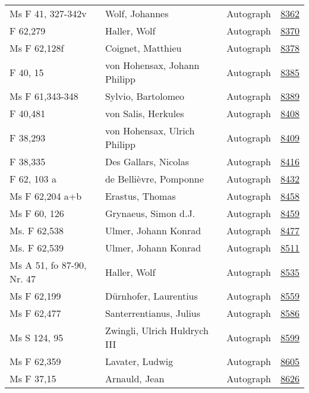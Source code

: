 \documentclass[10pt,a4paper,landscape]{report}
\begin{document}
\begin{longtable}{p{16cm}p{4cm}lr}
Ms F 41, 327-342v	&	Wolf, Johannes	&	Autograph	&	\href{http://130.60.24.72/assignment/8362}{8362}\\
F 62,279	&	Haller, Wolf	&	Autograph	&	\href{http://130.60.24.72/assignment/8370}{8370}\\
Ms F 62,128f	&	Coignet, Matthieu	&	Autograph	&	\href{http://130.60.24.72/assignment/8378}{8378}\\
F 40, 15	&	von Hohensax, Johann Philipp	&	Autograph	&	\href{http://130.60.24.72/assignment/8385}{8385}\\
Ms F 61,343-348	&	Sylvio, Bartolomeo	&	Autograph	&	\href{http://130.60.24.72/assignment/8389}{8389}\\
F 40,481	&	von Salis, Herkules	&	Autograph	&	\href{http://130.60.24.72/assignment/8408}{8408}\\
F 38,293	&	von Hohensax, Ulrich Philipp	&	Autograph	&	\href{http://130.60.24.72/assignment/8409}{8409}\\
F 38,335	&	Des Gallars, Nicolas	&	Autograph	&	\href{http://130.60.24.72/assignment/8416}{8416}\\
F 62, 103 a	&	de Bellièvre, Pomponne	&	Autograph	&	\href{http://130.60.24.72/assignment/8432}{8432}\\
Ms F 62,204 a+b	&	Erastus, Thomas	&	Autograph	&	\href{http://130.60.24.72/assignment/8458}{8458}\\
Ms F 60, 126	&	Grynaeus, Simon d.J.	&	Autograph	&	\href{http://130.60.24.72/assignment/8459}{8459}\\
Ms. F 62,538	&	Ulmer, Johann Konrad	&	Autograph	&	\href{http://130.60.24.72/assignment/8477}{8477}\\
Ms. F 62,539	&	Ulmer, Johann Konrad	&	Autograph	&	\href{http://130.60.24.72/assignment/8511}{8511}\\
Ms A 51, fo 87-90, Nr. 47	&	Haller, Wolf	&	Autograph	&	\href{http://130.60.24.72/assignment/8535}{8535}\\
Ms F 62,199	&	Dürnhofer, Laurentius	&	Autograph	&	\href{http://130.60.24.72/assignment/8559}{8559}\\
Ms F 62,477	&	Santerrentianus, Julius	&	Autograph	&	\href{http://130.60.24.72/assignment/8586}{8586}\\
Ms S 124, 95	&	Zwingli, Ulrich Huldrych III	&	Autograph	&	\href{http://130.60.24.72/assignment/8599}{8599}\\
Ms F 62,359	&	Lavater, Ludwig	&	Autograph	&	\href{http://130.60.24.72/assignment/8605}{8605}\\
Ms F 37,15	&	Arnauld, Jean	&	Autograph	&	\href{http://130.60.24.72/assignment/8626}{8626}\\

\end{longtable}
\end{document}
